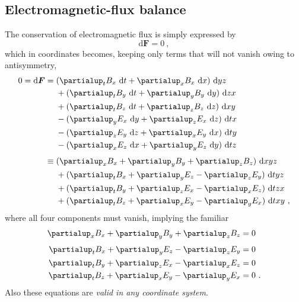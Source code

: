 \documentclass[\ifafour a4paper,12pt,\else a5paper,10pt,\fi%
onecolumn,oneside,article,%
british%
]{memoir}
\theoremstyle{remark}
\theoremstyle{innote}
\newcommand*{\de}{\partialup}%
\newcommand*{\di}{\mathrm{d}}%
\renewcommand*{\|}[1][]{\nonscript\:#1\vert\nonscript\:\mathopen{}}
\begin{document}
\subsection{Electromagnetic-flux balance}
\label{sec:em_balance}

The conservation of electromagnetic flux is simply expressed by
\begin{equation}
  \label{eq:cons_EM}
  \di \bm{F} = 0 \ ,
\end{equation}
which in coordinates becomes, keeping only terms that will not vanish owing to antisymmetry,
\begin{equation}
  \label{eq:cons_EM_coords}
  \begin{split}
    0 = \di\bm{F} &=
    \!\begin{aligned}[t]
     & (\de_{t}B_{x}\ \di t + \de_{x}B_{x}\ \di x)\ \di yz\\
    &{}+ (\de_{t}B_{y}\ \di t + \de_{y}B_{y}\ \di y)\ \di zx\\
    &{}+  (\de_{t}B_{z}\ \di t + \de_{z}B_{z}\ \di z)\ \di xy\\
    &{}- (\de_{y}E_{x}\ \di y + \de_{z}E_{x}\ \di z)\ \di tx\\
    &{}- (\de_{z}E_{y}\ \di z + \de_{x}E_{y}\ \di x)\ \di ty\\
    &{}- (\de_{x}E_{z}\ \di x + \de_{y}E_{z}\ \di y)\ \di tz
    \end{aligned}
  \\[\jot]
  &\equiv
  \!\begin{aligned}[t]
&(\de_{x}B_{x} + \de_{y}B_{y} + \de_{z}B_{z})\ \di xyz \\
  &{}+ (\de_{t}B_{x} + \de_{y}E_{z} - \de_{z}E_{y})\ \di tyz \\
  &{}+ (\de_{t}B_{y} + \de_{z}E_{x} - \de_{x}E_{z})\ \di tzx \\
  &{}+ (\de_{t}B_{z} + \de_{x}E_{y} - \de_{y}E_{x})\ \di txy \ ,
\end{aligned}
  \end{split}
\end{equation}
where all four components must vanish, implying the familiar
\begin{equation}
  \label{eq:cons_EM_familiar}
  \begin{aligned}
    \de_{x}B_{x} + \de_{y}B_{y} + \de_{z}B_{z} &= 0 \\[\jot]
  \de_{t}B_{x} + \de_{y}E_{z} - \de_{z}E_{y} &=0 \\
  \de_{t}B_{y} + \de_{z}E_{x} - \de_{x}E_{z} &=0 \\
  \de_{t}B_{z} + \de_{x}E_{y} - \de_{y}E_{x} &=0 \ .
\end{aligned}
\end{equation}
Also these equations are \emph{valid in any coordinate system}.
\end{document}
